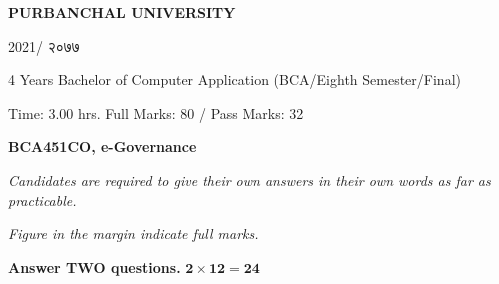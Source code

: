 \documentclass[a4paper, twoside, 12pt, noanswers]{exam}
\newcommand{\textnp}{\texthindi}
\begin{document}
\newpage

%
%

\begin{framed}
	\raggedright{\bfseries\Large\centering PURBANCHAL UNIVERSITY \par {2021/ \textnp{२०७७}}\par}
	{ 4 Years Bachelor of Computer Application (BCA/Eighth Semester/Final)\par}
	{ Time: 3.00 hrs.  \hfill Full Marks: 80 / Pass Marks: 32\par}
	{\bfseries {BCA451CO, e-Governance \hfill}\par}
\end{framed}

{\noindent \it{Candidates are required to give their own answers in their own words as far as practicable.  }\par}
{\noindent \it{Figure in the margin indicate full marks.}\par}

{}
{\hspace*{-0.5cm} \bfseries Answer TWO questions.} \hfill {\( \mathbf{2\times 12 =24}\)}
\end{document}
